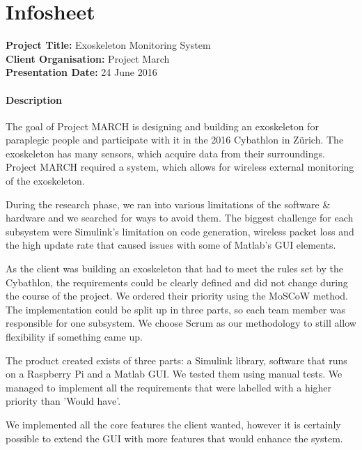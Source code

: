 \chapter{Infosheet}
\pagebreak
\begin{small}
{\bfseries Project Title:} Exoskeleton Monitoring System\\
{\bfseries Client Organisation:} Project March\\
{\bfseries Presentation Date:} 24 June 2016

\subsubsection{Description}
The goal of Project MARCH is designing and building an exoskeleton for paraplegic people and participate with it in the 2016 Cybathlon in Zürich. The exoskeleton has many sensors, which acquire data from their surroundings. Project MARCH required a system, which allows for wireless external monitoring of the exoskeleton. 

During the research phase, we ran into various limitations of the software \& hardware and we searched for ways to avoid them. The biggest challenge for each subsystem were Simulink's limitation on code generation, wireless packet loss and the high update rate that caused issues with some of Matlab's GUI elements.  

As the client was building an exoskeleton that had to meet the rules set by the Cybathlon, the requirements could be clearly defined and did not change during the course of the project. We ordered their priority using the MoSCoW method. The implementation could be split up in three parts, so each team member was responsible for one subsystem. We choose Scrum as our methodology to still allow flexibility if something came up.

The product created exists of three parts: a Simulink library, software that runs on a Raspberry Pi and a Matlab GUI. We tested them using manual tests. We managed to implement all the requirements that were labelled with a higher priority than 'Would have'. 

We implemented all the core features the client wanted, however it is certainly possible to extend the GUI with more features that would enhance the system.


\end{small}
